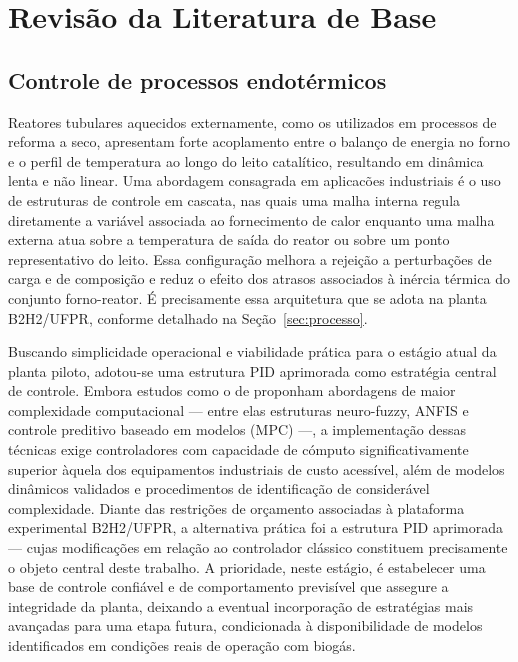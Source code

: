 
\section{Revisão da Literatura de Base}
\label{sec:revisao}

\subsection{Controle de processos endotérmicos}


Reatores tubulares aquecidos externamente, como os utilizados em processos de
reforma a seco, apresentam forte acoplamento entre o balanço de energia no
forno e o perfil de temperatura ao longo do leito catalítico, resultando em
dinâmica lenta e não linear.\citep{luyben2014} Uma abordagem consagrada em
aplicacões industriais é o uso de estruturas de controle em cascata, nas quais
uma malha interna regula diretamente a variável associada ao fornecimento de
calor enquanto uma malha externa atua sobre a temperatura de saída do reator
ou sobre um ponto representativo do leito.\citep{luyben2014} Essa configuração
melhora a rejeição a perturbações de carga e de composição e reduz o efeito
dos atrasos associados à inércia térmica do conjunto forno-reator. É
precisamente essa arquitetura que se adota na planta B2H2/UFPR, conforme
detalhado na Seção~\ref{sec:processo}.

Buscando simplicidade operacional e viabilidade prática para o estágio atual
da planta piloto, adotou-se uma estrutura PID aprimorada como estratégia
central de controle. Embora estudos como o de \citeauthor{essien2019} proponham
abordagens de maior complexidade computacional --- entre elas estruturas
neuro-fuzzy, ANFIS e controle preditivo baseado em modelos (MPC)
---,\citep{essien2019} a implementação dessas técnicas exige controladores
com capacidade de cómputo significativamente superior àquela dos
equipamentos industriais de custo acessível, além de modelos dinâmicos
validados e procedimentos de identificação de considerável complexidade.
Diante das restrições de orçamento associadas à plataforma experimental
B2H2/UFPR, a alternativa prática foi a estrutura PID aprimorada --- cujas
modificações em relação ao controlador clássico constituem precisamente o
objeto central deste trabalho.
A prioridade, neste estágio, é estabelecer uma base de controle confiável
e de comportamento previsível que assegure a integridade da planta, deixando
a eventual incorporação de estratégias mais avançadas para uma etapa futura,
condicionada à disponibilidade de modelos identificados em condições reais
de operação com biogás.

